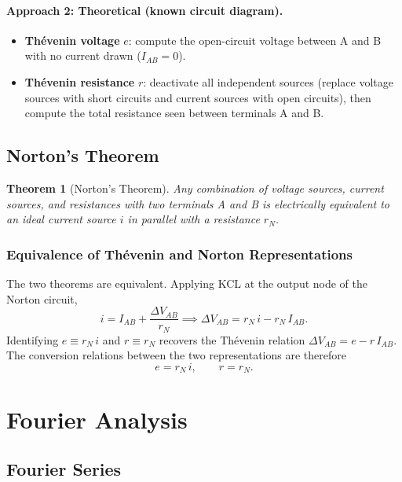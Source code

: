\documentclass{article}
\newtheorem{theorem}{Theorem}
\begin{document}
\paragraph{Approach 2: Theoretical (known circuit diagram).}
\begin{itemize}
    \item \textbf{Thévenin voltage} $e$: compute the open-circuit voltage between A and B with no current drawn ($I_{AB} = 0$).
    \item \textbf{Thévenin resistance} $r$: deactivate all independent sources (replace voltage sources with short circuits and current sources with open circuits), then compute the total resistance seen between terminals A and B.
\end{itemize}

\subsection{Norton's Theorem}

\begin{theorem}[Norton's Theorem]
    Any combination of voltage sources, current sources, and resistances with two terminals A and B is electrically equivalent to an ideal current source $i$ in parallel with a resistance $r_N$.
\end{theorem}

\subsubsection{Equivalence of Thévenin and Norton Representations}

The two theorems are equivalent. Applying KCL at the output node of the Norton circuit,
\[i = I_{AB} + \frac{\Delta V_{AB}}{r_N} \implies \Delta V_{AB} = r_N\,i - r_N\,I_{AB}.\]
Identifying $e \equiv r_N\,i$ and $r \equiv r_N$ recovers the Thévenin relation $\Delta V_{AB} = e - r\,I_{AB}$. The conversion relations between the two representations are therefore
\[e = r_N\,i, \qquad r = r_N.\]

\section{Fourier Analysis}

\subsection{Fourier Series}
\end{document}
